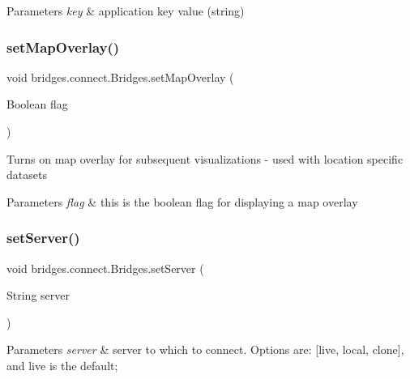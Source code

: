 \begin{DoxyParams}{Parameters}
{\em key} & application key value (string) \\
\hline
\end{DoxyParams}
\mbox{\label{classbridges_1_1connect_1_1_bridges_a4af383ba2f114ad7bd4e08eb44096973}} 
\subsubsection{\texorpdfstring{set\+Map\+Overlay()}{setMapOverlay()}}
{\footnotesize\ttfamily void bridges.\+connect.\+Bridges.\+set\+Map\+Overlay (\begin{DoxyParamCaption}\item[{Boolean}]{flag }\end{DoxyParamCaption})}

Turns on map overlay for subsequent visualizations -\/ used with location specific datasets


\begin{DoxyParams}{Parameters}
{\em flag} & this is the boolean flag for displaying a map overlay \\
\hline
\end{DoxyParams}
\mbox{\label{classbridges_1_1connect_1_1_bridges_ab43e412448e1dfc340e58c407519a576}} 
\subsubsection{\texorpdfstring{set\+Server()}{setServer()}}
{\footnotesize\ttfamily void bridges.\+connect.\+Bridges.\+set\+Server (\begin{DoxyParamCaption}\item[{String}]{server }\end{DoxyParamCaption})}


\begin{DoxyParams}{Parameters}
{\em server} & server to which to connect. Options are\+: \mbox{[}\textquotesingle{}live\textquotesingle{}, \textquotesingle{}local\textquotesingle{}, \textquotesingle{}clone\textquotesingle{}\mbox{]}, and \textquotesingle{}live\textquotesingle{} is the default; \\
\hline
\end{DoxyParams}
\mbox{\label{classbridges_1_1connect_1_1_bridges_aed3752ee6318a48dff271d9a9e2a8fcc}} 
